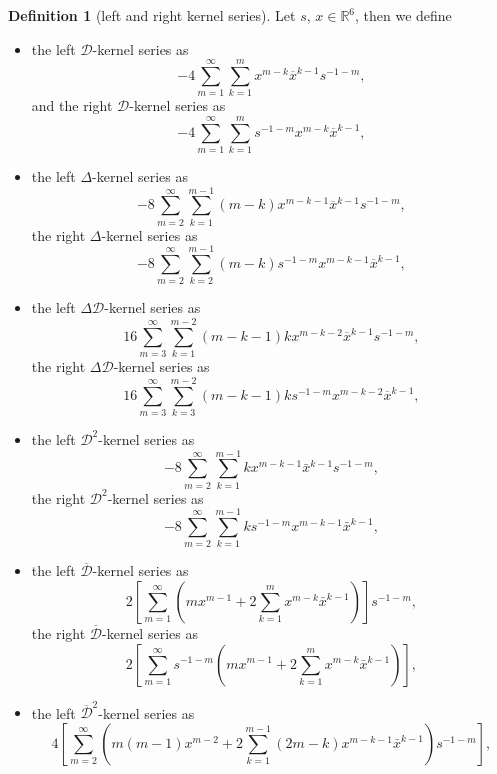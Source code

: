 \documentclass[reqno,11pt]{amsart}
\numberwithin{equation}{section}
\theoremstyle{definition}
\newtheorem{definition}[theorem]{Definition}
\begin{document}
\begin{definition}[left and right kernel series]
Let $s,\, x\in\mathbb R^6$, then we define
\begin{itemize}
\item the left $ \mathcal{D}$-kernel series as
\begin{equation}
\label{q1res_ser}
-4\sum_{m=1}^{\infty}\sum_{k=1}^m x^{m-k}\overline x^{k-1} s^{-1-m},
\end{equation}
and the right $ \mathcal{D}$-kernel series as
$$ -4\sum_{m=1}^{\infty}\sum_{k=1}^m  s^{-1-m} x^{m-k}\overline x^{k-1},$$
\item the left $ \Delta$-kernel series as
\begin{equation}
\label{f1res_ser}
-8\sum_{m=2}^{\infty}\sum_{k=1}^{m-1} (m-k)x^{m-k-1}\overline x^{k-1}s^{-1-m},
\end{equation}
the right $ \Delta$-kernel series as
$$-8\sum_{m=2}^{\infty}\sum_{k=2}^{m-1} (m-k)s^{-1-m}x^{m-k-1}\overline x^{k-1},$$
\item the left $ \Delta \mathcal{D}$-kernel series as
\begin{equation}
\label{q2res_ser}
16\sum_{m=3}^\infty\sum_{k=1}^{m-2}(m-k-1)kx^{m-k-2}\overline x^{k-1} s^{-1-m},
\end{equation}
the right $ \Delta \mathcal{D}$-kernel series as
$$ 16\sum_{m=3}^\infty\sum_{k=3}^{m-2}(m-k-1)k s^{-1-m} x^{m-k-2}\overline x^{k-1},$$
\item the left $ \mathcal{D}^2$-kernel series as
\begin{equation}
-8 \sum_{m=2}^\infty \sum_{k=1}^{m-1} k x^{m-k-1} \bar{x}^{k-1}s^{-1-m},
\end{equation}
the right $ \mathcal{D}^2$-kernel series as
$$-8 \sum_{m=2}^\infty \sum_{k=1}^{m-1} k s^{-1-m} x^{m-k-1} \bar{x}^{k-1},$$
\item the left $ \mathcal{\overline{D}}$-kernel series as
\begin{equation}
\label{abs1}
2  \left[\sum_{m=1}^\infty \left(mx^{m-1}  +2  \sum_{k=1}^{m} x^{m-k} \bar{x}^{k-1} \right) \right] s^{-1-m},
\end{equation}
the right $ \mathcal{\overline{D}}$-kernel series as
$$2  \left[\sum_{m=1}^\infty s^{-1-m} \left(mx^{m-1}  +2  \sum_{k=1}^{m} x^{m-k} \bar{x}^{k-1} \right) \right] ,$$
\item the left $ \mathcal{\overline{D}}^2$-kernel series as
\begin{equation}
\label{abs2}
4 \left[\sum_{m=2}^\infty \left(m(m-1)x^{m-2}+2  \sum_{k=1}^{m-1} (2m-k)x^{m-k-1}\bar{x}^{k-1}\right) s^{-1-m} \right],

\end{equation}
\end{itemize}
\end{definition}
\end{document}
